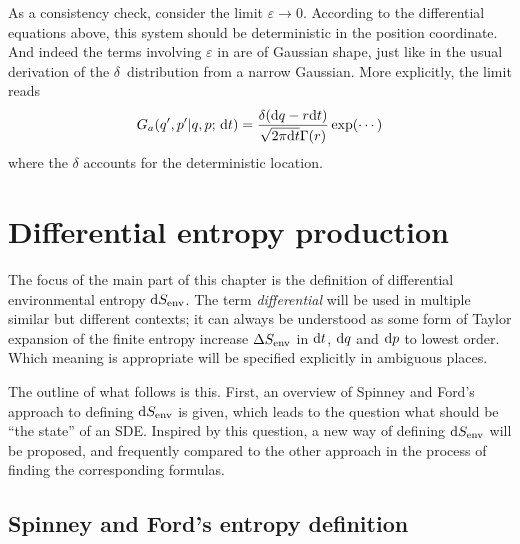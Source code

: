 As a consistency check, consider the limit \(\varepsilon\to0\). According to the differential equations above, this system should be deterministic in the position coordinate. And indeed the terms involving \(\varepsilon\) in  are of Gaussian shape, just like in the usual derivation of the \(\delta\)~distribution from a narrow Gaussian. More explicitly, the limit reads
%
\begin{equation}
	\label{eqn:delta-limit}
	\begin{split}
		G_a (q',p' | q,p;\,\mathrm{d} t) =
		\frac{\delta(\mathrm{d} q-r\mathrm{d} t)}{\sqrt{2\pi\mathrm{d} t}\Gamma(r)}\operatorname{exp}(\cdots)
	\end{split}
\end{equation}
%
where the \(\delta\) accounts for the deterministic location.



\section{Differential entropy production}
\label{sec:differential entropy production}

The focus of the main part of this chapter is the definition of differential environmental entropy \(\mathrm{d}S_\text{env}\). The term \emph{differential} will be used in multiple similar but different contexts; it can always be understood as some form of Taylor expansion of the finite entropy increase \(\Delta S_\text{env}\) in \(\mathrm{d} t\), \(\mathrm{d} q\) and \(\mathrm{d} p\) to lowest order. Which meaning is appropriate will be specified explicitly in ambiguous places.

The outline of what follows is this. First, an overview of Spinney and Ford's approach to defining \(\mathrm{d}S_\text{env}\) is given, which leads to the question what should be ``the state'' of an SDE. Inspired by this question, a new way of defining \(\mathrm{d}S_\text{env}\) will be proposed, and frequently compared to the other approach in the process of finding the corresponding formulas.



\subsection{Spinney and Ford's entropy definition}



